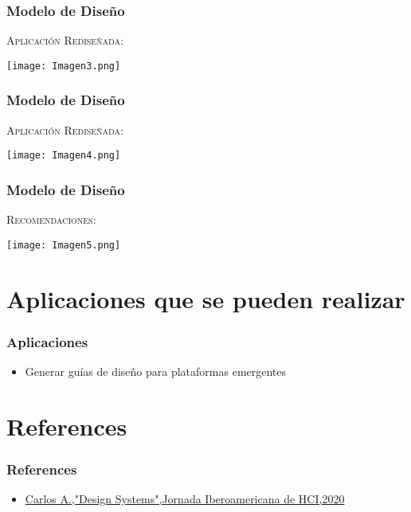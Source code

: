 \documentclass[11pt]{beamer}
\begin{document}
\begin{frame}
\frametitle{Modelo de Diseño}
\begin{itemize}
    \textsc{Aplicación Rediseñada: }
\end{itemize}
\begin{itemize}
\texttt{[image: Imagen3.png]}
\centering
\end{itemize}
\end{frame}

\begin{frame}
\frametitle{Modelo de Diseño}
\begin{itemize}
    \textsc{Aplicación Rediseñada: }
\end{itemize}
\begin{itemize}
\texttt{[image: Imagen4.png]}
\centering
\end{itemize}
\end{frame}

\begin{frame}
\frametitle{Modelo de Diseño}
\begin{itemize}
    \textsc{Recomendaciones: }
\end{itemize}
\begin{itemize}
\texttt{[image: Imagen5.png]}
\centering
\end{itemize}
\end{frame}

\section{Aplicaciones que se pueden realizar}
\begin{frame}
\frametitle{Aplicaciones}
\begin{itemize}
    \item Generar guías de diseño para plataformas emergentes
\end{itemize}
\end{frame}

\section{References}
\begin{frame}
\frametitle{References}
\begin{itemize}
\item \href{https://www.youtube.com/watch?v=meO8gkOK1pc&feature=youtu.be}{Carlos A.,"Design Systems",Jornada Iberoamericana de HCI,2020}

\end{itemize}
\end{frame}
\end{document}
